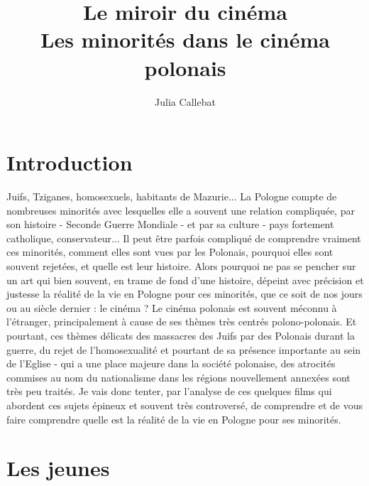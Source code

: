 \documentclass[12pt]{amsart}
\title{Le miroir du cinéma \\ Les minorités dans le cinéma polonais}
\author{Julia Callebat}
\begin{document}
\maketitle

\cleardoublepage
\tableofcontents
\cleardoublepage
\section*{Introduction}
Juifs, Tziganes, homosexuels, habitants de Mazurie... La Pologne compte de nombreuses minorités avec lesquelles elle a souvent une relation compliquée, par son histoire - Seconde Guerre Mondiale - et par sa culture - pays fortement catholique, conservateur... Il peut être parfois compliqué de comprendre vraiment ces minorités, comment elles sont vues par les Polonais, pourquoi elles sont souvent rejetées, et quelle est leur histoire. Alors pourquoi ne pas se pencher sur un art qui bien souvent, en trame de fond d'une histoire, dépeint avec précision et justesse la réalité de la vie en Pologne pour ces minorités, que ce soit de nos jours ou au siècle dernier : le cinéma ?
Le cinéma polonais est souvent méconnu à l'étranger, principalement à cause de ses thèmes très centrés polono-polonais. Et pourtant, ces thèmes délicats des massacres des Juifs par des Polonais durant la guerre, du rejet de l'homosexualité et pourtant de sa présence importante au sein de l'Eglise - qui a une place majeure dans la société polonaise, des atrocités commises au nom du nationalisme dans les régions nouvellement annexées sont très peu traités. 
Je vais donc tenter, par l'analyse de ces quelques films qui abordent ces sujets épineux et souvent très controversé, de comprendre et de vous faire comprendre quelle est la réalité de la vie en Pologne pour ses minorités. 

\clearpage
\section{Les jeunes}
\end{document}
